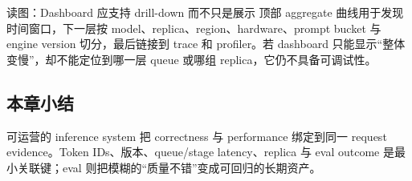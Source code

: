 
\begin{knowledgebox}{读图：Dashboard 应支持 drill-down 而不只是展示}
顶部 aggregate 曲线用于发现时间窗口，下一层按 model、replica、region、hardware、prompt bucket 与 engine version 切分，最后链接到 trace 和 profiler。若 dashboard 只能显示“整体变慢”，却不能定位到哪一层 queue 或哪组 replica，它仍不具备可调试性。
\end{knowledgebox}

\subsection{本章小结}

可运营的 inference system 把 correctness 与 performance 绑定到同一 request evidence。Token IDs、版本、queue/stage latency、replica 与 eval outcome 是最小关联键；eval 则把模糊的“质量不错”变成可回归的长期资产。

